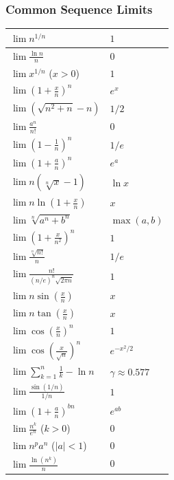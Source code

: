 \subsubsection{Common Sequence Limits}
\begin{center}
\footnotesize
\setlength{\tabcolsep}{2pt}
\begin{tabularx}{\columnwidth}{|>{\hsize=1.2\hsize\raggedright\arraybackslash}X|>{\hsize=0.8\hsize\raggedright\arraybackslash}X|}
\hline
$\lim n^{1/n}$ & $1$ \\ \hline
$\lim \frac{\ln n}{n}$ & $0$ \\ \hline
$\lim x^{1/n}$ ($x>0$) & $1$ \\ \hline
$\lim (1+\frac{x}{n})^n$ & $e^x$ \\ \hline
$\lim (\sqrt{n^2+n}-n)$ & $1/2$ \\ \hline
$\lim \frac{a^n}{n!}$ & $0$ \\ \hline
$\lim (1-\frac{1}{n})^n$ & $1/e$ \\ \hline
$\lim (1+\frac{a}{n})^n$ & $e^a$ \\ \hline
$\lim n(\sqrt[n]{x}-1)$ & $\ln x$ \\ \hline
$\lim n \ln(1+\frac{x}{n})$ & $x$ \\ \hline
$\lim \sqrt[n]{a^n+b^n}$ & $\max(a,b)$ \\ \hline
$\lim (1+\frac{x}{n^2})^n$ & $1$ \\ \hline
$\lim \frac{\sqrt[n]{n!}}{n}$ & $1/e$ \\ \hline
$\lim \frac{n!}{(n/e)^n \sqrt{2\pi n}}$ & $1$ \\ \hline
$\lim n \sin(\frac{x}{n})$ & $x$ \\ \hline
$\lim n \tan(\frac{x}{n})$ & $x$ \\ \hline
$\lim \cos(\frac{x}{n})^n$ & $1$ \\ \hline
$\lim \cos(\frac{x}{\sqrt{n}})^n$ & $e^{-x^2/2}$ \\ \hline
$\lim \sum_{k=1}^n \frac{1}{k} - \ln n$ & $\gamma \approx 0.577$ \\ \hline
$\lim \frac{\sin(1/n)}{1/n}$ & $1$ \\ \hline
$\lim (1+\frac{a}{n})^{bn}$ & $e^{ab}$ \\ \hline
$\lim \frac{n^k}{e^n}$ ($k>0$) & $0$ \\ \hline
$\lim n^p a^n$ ($|a|<1$) & $0$ \\ \hline
$\lim \frac{\ln(n^k)}{n}$ & $0$ \\ \hline
\end{tabularx}
\end{center}

